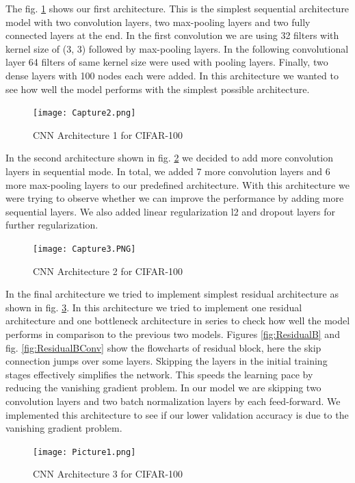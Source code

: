\documentclass{article}
\begin{document}
The fig. \ref{fig:Cifar100A1} shows our first architecture. This is the simplest sequential architecture model with two convolution layers, two max-pooling layers and two fully connected layers at the end. In the first convolution we are using 32 filters with kernel size of (3, 3) followed by max-pooling layers. In the following convolutional layer 64 filters of same kernel size were used with pooling layers. Finally, two dense layers with 100 nodes each were added. In this architecture we wanted to see how well the model performs with the simplest possible architecture.

\begin{figure}[H]
    \centering
    \texttt{[image: Capture2.png]}
    \caption{CNN Architecture 1 for CIFAR-100}
    \label{fig:Cifar100A1}
\end{figure}

In the second architecture shown in fig. \ref{fig:Cifar100A2} we decided to add more convolution layers in sequential mode. In total, we added 7 more convolution layers and 6 more max-pooling layers to our predefined architecture. With this architecture we were trying to observe whether we can improve the performance by adding more sequential layers. We also added linear regularization l2 and dropout layers for further regularization.

\begin{figure}[H]
    \centering
    \texttt{[image: Capture3.PNG]}
    \caption{CNN Architecture 2 for CIFAR-100}
    \label{fig:Cifar100A2}
\end{figure}

In the final architecture we tried to implement simplest residual architecture as shown in fig. \ref{fig:Cifar100A3}. In this architecture we tried to implement one residual architecture and one bottleneck architecture in series to check how well the model performs in comparison to the previous two models. Figures \ref{fig:ResidualB} and fig. \ref{fig:ResidualBConv} show the flowcharts of residual block, here the skip connection jumps over some layers. Skipping the layers in the initial training stages effectively simplifies the network. This speeds the learning pace by reducing the vanishing gradient problem. In our model we are skipping two convolution layers and two batch normalization layers by each feed-forward. We implemented this architecture to see if our lower validation accuracy is due to the vanishing gradient problem.

\begin{figure}[H]
    \centering
    \texttt{[image: Picture1.png]}
    \caption{CNN Architecture 3 for CIFAR-100}
    \label{fig:Cifar100A3}
\end{figure}
\end{document}
